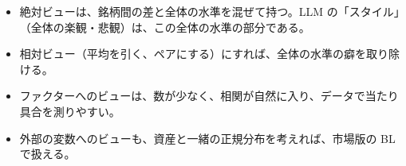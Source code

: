 \begin{keybox}[この章のまとめ]
\begin{itemize}
\item 絶対ビューは、銘柄間の差と全体の水準を混ぜて持つ。LLM の「スタイル」（全体の楽観・悲観）は、この全体の水準の部分である。
\item 相対ビュー（平均を引く、ペアにする）にすれば、全体の水準の癖を取り除ける。
\item ファクターへのビューは、数が少なく、相関が自然に入り、データで当たり具合を測りやすい。
\item 外部の変数へのビューも、資産と一緒の正規分布を考えれば、市場版の BL で扱える。
\end{itemize}
\end{keybox}
